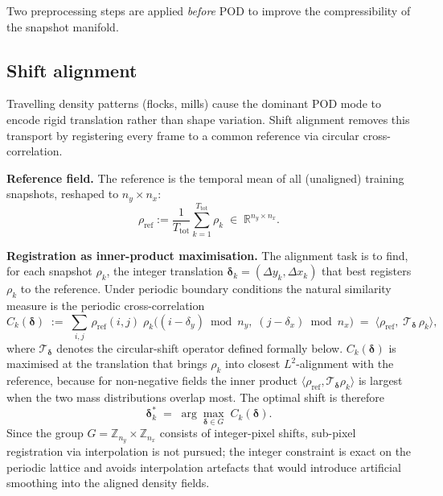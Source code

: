 Two preprocessing steps are applied \emph{before} POD to improve
the compressibility of the snapshot manifold.

\subsection{Shift alignment}
\label{subsec:shift_align}

Travelling density patterns (flocks, mills) cause the dominant POD mode to
encode rigid translation rather than shape variation.  Shift alignment
removes this transport by registering every frame to a common reference via
circular cross-correlation.

\noindent\textbf{Reference field.}
The reference is the temporal mean of all (unaligned) training snapshots,
reshaped to $n_y\times n_x$:
\begin{equation}
  \rho_{\mathrm{ref}}
  := \frac{1}{T_{\mathrm{tot}}}\sum_{k=1}^{T_{\mathrm{tot}}}\rho_k
  \;\in\;\mathbb{R}^{n_y\times n_x}.
  \label{eq:shift_ref}
\end{equation}

\noindent\textbf{Registration as inner-product maximisation.}
The alignment task is to find, for each snapshot $\rho_k$, the integer
translation $\boldsymbol{\delta}_k = (\Delta y_k,\Delta x_k)$ that
best registers $\rho_k$ to the reference.  Under periodic boundary
conditions the natural similarity measure is the periodic
cross-correlation
\begin{equation}
  C_k(\boldsymbol{\delta})
  \;:=\;
  \sum_{i,j}\,
    \rho_{\mathrm{ref}}(i,j)\;
    \rho_k\!\bigl((i-\delta_y)\bmod n_y,\;(j-\delta_x)\bmod n_x\bigr)
  \;=\;
  \langle \rho_{\mathrm{ref}},\;
  \mathcal{T}_{\boldsymbol{\delta}}\,\rho_k \rangle,
  \label{eq:periodic_xcorr}
\end{equation}
where $\mathcal{T}_{\boldsymbol{\delta}}$ denotes the circular-shift
operator defined formally below.
$C_k(\boldsymbol{\delta})$ is maximised at the translation that brings
$\rho_k$ into closest $L^2$-alignment with the reference, because for
non-negative fields the inner product $\langle\rho_{\mathrm{ref}},
\mathcal{T}_{\boldsymbol{\delta}}\rho_k\rangle$ is largest when the
two mass distributions overlap most.  The optimal shift is therefore
\begin{equation}
  \boldsymbol{\delta}_k^*
  \;=\;
  \arg\max_{\boldsymbol{\delta}\in G}\;
  C_k(\boldsymbol{\delta}).
  \label{eq:optimal_shift}
\end{equation}
Since the group $G = \mathbb{Z}_{n_y}\!\times\!\mathbb{Z}_{n_x}$
consists of integer-pixel shifts, sub-pixel registration via
interpolation is not pursued; the integer constraint is exact on the
periodic lattice and avoids interpolation artefacts that would
introduce artificial smoothing into the aligned density fields.

